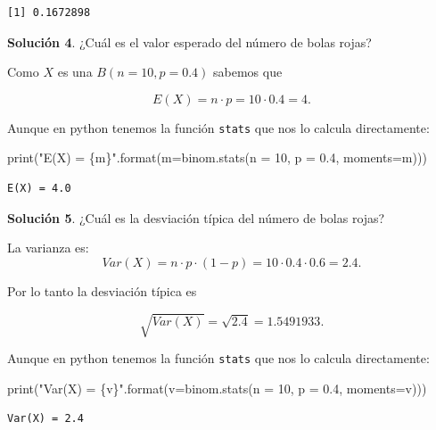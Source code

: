 \documentclass[
  letterpaper,
  DIV=11,
  numbers=noendperiod]{scrreprt}
\newenvironment{Shaded}{\begin{snugshade}}{\end{snugshade}}
\newcommand{\BuiltInTok}[1]{\textcolor[rgb]{0.00,0.23,0.31}{#1}}
\newcommand{\DecValTok}[1]{\textcolor[rgb]{0.68,0.00,0.00}{#1}}
\newcommand{\FloatTok}[1]{\textcolor[rgb]{0.68,0.00,0.00}{#1}}
\newcommand{\NormalTok}[1]{\textcolor[rgb]{0.00,0.23,0.31}{#1}}
\newcommand{\OperatorTok}[1]{\textcolor[rgb]{0.37,0.37,0.37}{#1}}
\newcommand{\SpecialCharTok}[1]{\textcolor[rgb]{0.37,0.37,0.37}{#1}}
\newcommand{\StringTok}[1]{\textcolor[rgb]{0.13,0.47,0.30}{#1}}
\begin{document}
\begin{verbatim}
[1] 0.1672898
\end{verbatim}

\textbf{Solución 4}. ¿Cuál es el valor esperado del número de bolas
rojas?

Como \(X\) es una \(B(n=10,p=0.4)\) sabemos que

\[E(X)=n\cdot p = 10\cdot 0.4=4.\]

Aunque en python tenemos la función \texttt{stats} que nos lo calcula
directamente:

\begin{Shaded}
\begin{Highlighting}[]
\BuiltInTok{print}\NormalTok{(}\StringTok{"E(X) = }\SpecialCharTok{\{m\}}\StringTok{"}\NormalTok{.}\BuiltInTok{format}\NormalTok{(m}\OperatorTok{=}\NormalTok{binom.stats(n }\OperatorTok{=} \DecValTok{10}\NormalTok{, p }\OperatorTok{=} \FloatTok{0.4}\NormalTok{, moments}\OperatorTok{=}\StringTok{\textquotesingle{}m\textquotesingle{}}\NormalTok{)))}
\end{Highlighting}
\end{Shaded}

\begin{verbatim}
E(X) = 4.0
\end{verbatim}

\textbf{Solución 5}. ¿Cuál es la desviación típica del número de bolas
rojas?

La varianza es: \[
Var(X)=n\cdot p \cdot(1-p)=10\cdot 0.4\cdot 0.6=2.4.
\]

Por lo tanto la desviación típica es

\[\sqrt{Var(X)}=\sqrt{2.4}= 1.5491933.\]

Aunque en python tenemos la función \texttt{stats} que nos lo calcula
directamente:

\begin{Shaded}
\begin{Highlighting}[]
\BuiltInTok{print}\NormalTok{(}\StringTok{"Var(X) = }\SpecialCharTok{\{v\}}\StringTok{"}\NormalTok{.}\BuiltInTok{format}\NormalTok{(v}\OperatorTok{=}\NormalTok{binom.stats(n }\OperatorTok{=} \DecValTok{10}\NormalTok{, p }\OperatorTok{=} \FloatTok{0.4}\NormalTok{, moments}\OperatorTok{=}\StringTok{\textquotesingle{}v\textquotesingle{}}\NormalTok{)))}
\end{Highlighting}
\end{Shaded}

\begin{verbatim}
Var(X) = 2.4
\end{verbatim}
\end{document}
